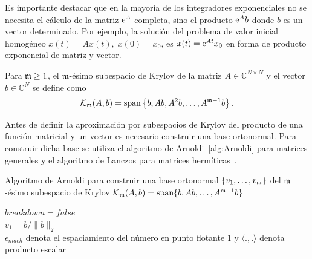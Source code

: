 Es importante destacar que en la mayoría de los integradores exponenciales
 no se necesita el cálculo de la matriz $\mathrm{e}^{A}$ completa, sino
el producto $\mathrm{e}^{A}b$ donde $b$ es un vector determinado. Por ejemplo, la solución del problema de valor inicial homogéneo $\dot{x}(t)=Ax(t),\;x(0)=x_0$, es $x(t)=\mathrm{e}^{At}x_0$ en forma de producto exponencial de matriz y vector. 
\begin{definition}
        \cite{Saad92} Para $\mathfrak{m}\geq 1$, el $\mathfrak{m}$-ésimo subespacio de Krylov de la matriz $A\in\mathbb{C}^{N\times N}$
    y el vector $b\in\mathbb{C}^{N}$ se define como
    \[ \mathcal{K}_{\mathfrak{m}}(A,b)=\mathrm{span}\left\{ b,Ab,A^{2}b,\ldots,A^{\mathfrak{m}-1}b \right\}. \]
\end{definition}

Antes de definir la aproximación por subespacios de Krylov del producto de una función matricial y un vector es
necesario construir una base ortonormal. Para construir dicha base se utiliza el algoritmo de
Arnoldi~\ref{alg:Arnoldi} para matrices generales y el algoritmo de 
Lanczos para matrices hermíticas~\cite{arnoldi,saad2003iterative}.

\begin{algorithm}
    \caption{Algoritmo de Arnoldi para construir una base ortonormal $\{ v_1,\ldots,v_{\mathfrak{m}} \}$ del $\mathfrak{m}$-ésimo subespacio de Krylov $\mathcal{K}_{\mathfrak{m}}(A,b)=\mathrm{span} \{ b,Ab,\ldots, A^{\mathfrak{m}-1}b \}$}
    \label{alg:Arnoldi}

    $breakdown=false$\\
    $v_1=b/\lVert b \rVert_2$\\
\nonl $\epsilon_{mach}$ denota el espaciamiento del número en punto flotante 1 y $\langle . , .\rangle$ denota producto escalar
\end{algorithm}



